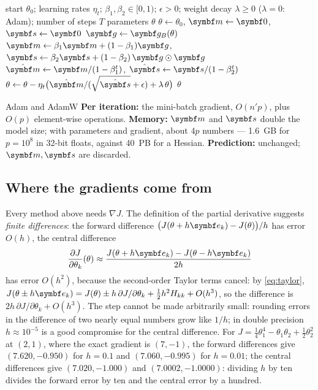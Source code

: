 \documentclass[11pt]{article}
\newcommand{\gvec}{\vect{g}}
\newcommand{\mvec}{\vect{m}}
\newcommand{\evec}{\vect{e}}
\begin{document}
\begin{algorithm}[tb]
\caption{Adam and AdamW}\label{alg:adam}
\begin{algorithmic}[1]
\Require start $\theta_0$; learning rates $\eta_t$; $\beta_1, \beta_2 \in [0, 1)$; $\epsilon > 0$; weight decay $\lambda \ge 0$ ($\lambda = 0$: Adam); number of steps $T$
\Ensure parameters $\theta$
  \State $\theta \gets \theta_0$, \quad $\mvec \gets \vect{0}$, \quad $\vect{s} \gets \vect{0}$
    \State $\gvec \gets \gvec_B(\theta)$ 
    \State $\mvec \gets \beta_1\mvec + (1 - \beta_1)\gvec$, \quad $\vect{s} \gets \beta_2\vect{s} + (1 - \beta_2)\,\gvec \odot \gvec$ 
    \State $\hat{\mvec} \gets \mvec/(1 - \beta_1^t)$, \quad $\hat{\vect{s}} \gets \vect{s}/(1 - \beta_2^t)$
    \State $\theta \gets \theta - \eta_t\big(\hat{\mvec}/(\sqrt{\hat{\vect{s}}} + \epsilon) + \lambda\,\theta\big)$ \label{line:decay} 
  \EndFor
  \State \Return $\theta$
\EndFunction
\end{algorithmic}
\end{algorithm}

\begin{runtime}{Adam and AdamW}
\textbf{Per iteration:} the mini-batch gradient, $O(n'p)$, plus $O(p)$ element-wise operations. \textbf{Memory:}
$\mvec$ and $\vect{s}$ double the model size; with parameters and gradient, about $4p$ numbers --- 1.6~GB for $p = 10^8$
in 32-bit floats, against 40~PB for a Hessian. \textbf{Prediction:} unchanged; $\mvec, \vect{s}$ are discarded.
\end{runtime}

\subsection{Where the gradients come from}\label{sec:autodiff}

Every method above needs $\nabla J$. The definition of the partial derivative suggests \emph{finite differences}: the
forward difference $\big(J(\theta + h\evec_k) - J(\theta)\big)/h$ has error $O(h)$, the central difference
\[
  \frac{\partial J}{\partial\theta_k}(\theta) \approx \frac{J(\theta + h\evec_k) - J(\theta - h\evec_k)}{2h}
\]
has error $O(h^2)$, because the second-order Taylor terms cancel: by \eqref{eq:taylor},
$J(\theta \pm h\evec_k) = J(\theta) \pm h\,\partial J/\partial\theta_k + \frac12h^2H_{kk} + O(h^3)$, so the difference is
$2h\,\partial J/\partial\theta_k + O(h^3)$. The step cannot be made arbitrarily small: rounding
errors in the difference of two nearly equal numbers grow like $1/h$; in double precision $h \approx 10^{-5}$ is a good
compromise for the central difference. For
$J = \frac14\theta_1^4 - \theta_1\theta_2 + \frac12\theta_2^2$ at $(2, 1)$, where the exact gradient is $(7, -1)$, the
forward differences give $(7.620, -0.950)$ for $h = 0.1$ and $(7.060, -0.995)$ for $h = 0.01$; the central differences
give $(7.020, -1.000)$ and $(7.0002, -1.0000)$: dividing $h$ by ten divides the forward error by ten and the
central error by a hundred.
\end{document}
